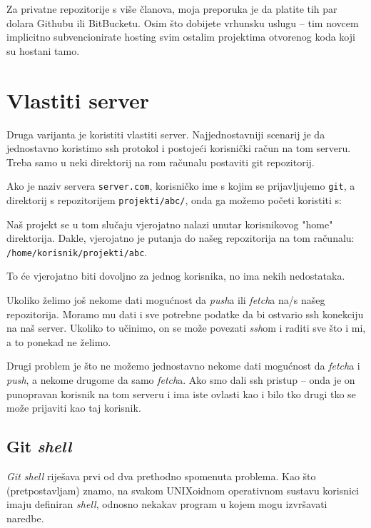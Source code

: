 Za privatne repozitorije s više članova, moja preporuka je da platite tih par dolara Githubu ili BitBucketu. 
Osim što dobijete vrhunsku uslugu -- tim novcem implicitno subvencionirate hosting svim ostalim projektima otvorenog koda koji su hostani tamo.

\section*{Vlastiti server}

Druga varijanta je koristiti vlastiti server.
Najjednostavniji scenarij je da jednostavno koristimo ssh protokol i postojeći korisnički račun na tom serveru. 
Treba samo u neki direktorij na rom računalu postaviti git repozitorij.

Ako je naziv servera \verb+server.com+, korisničko ime s kojim se prijavljujemo \verb+git+, a direktorij s repozitorijem \verb+projekti/abc/+, onda ga možemo početi koristiti s:


Naš projekt se u tom slučaju vjerojatno nalazi unutar korisnikovog "home" direktorija.
Dakle, vjerojatno je putanja do našeg repozitorija na tom računalu: \\\verb+/home/korisnik/projekti/abc+.

To će vjerojatno biti dovoljno za jednog korisnika, no ima nekih nedostataka.

Ukoliko želimo još nekome dati mogućnost da \emph{push}a ili \emph{fetch}a na/s našeg repozitorija. 
Moramo mu dati i sve potrebne podatke da bi ostvario ssh konekciju na naš server.
Ukoliko to učinimo, on se može povezati \emph{ssh}om i raditi sve što i mi, a to ponekad ne želimo.

Drugi problem je što ne možemo jednostavno nekome dati mogućnost da \emph{fetch}a i \emph{push}, a nekome drugome da samo \emph{fetch}a.
Ako smo dali ssh pristup -- onda je on punopravan korisnik na tom serveru i ima iste ovlasti kao i bilo tko drugi tko se može prijaviti kao taj korisnik.

\subsection*{Git \emph{shell}}

\emph{Git shell} riješava prvi od dva prethodno spomenuta problema. 
Kao što (pretpostavljam) znamo, na svakom UNIXoidnom operativnom sustavu korisnici imaju definiran \emph{shell}, odnosno nekakav program u kojem mogu izvršavati naredbe.

